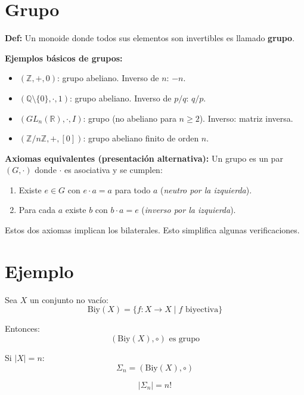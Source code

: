 \documentclass[12pt]{article}
\begin{document}
\section*{Grupo}

\textbf{Def:} Un monoide donde todos sus elementos son invertibles es llamado \textbf{grupo}.

\begin{tcolorbox}[iabox]
\textbf{Ejemplos básicos de grupos:}
\begin{itemize}
  \item $(\mathbb{Z},+,0)$: grupo abeliano. Inverso de $n$: $-n$.
  \item $(\mathbb{Q}\setminus\{0\},\cdot,1)$: grupo abeliano. Inverso de $p/q$: $q/p$.
  \item $(GL_n(\mathbb{R}),\cdot,I)$: grupo (no abeliano para $n\geq 2$). Inverso: matriz inversa.
  \item $(\mathbb{Z}/n\mathbb{Z},+,[0])$: grupo abeliano finito de orden $n$.
\end{itemize}

\textbf{Axiomas equivalentes (presentación alternativa):} Un grupo es un par $(G,\cdot)$ donde $\cdot$ es asociativa y se cumplen:
\begin{enumerate}
  \item Existe $e\in G$ con $e\cdot a=a$ para todo $a$ (\emph{neutro por la izquierda}).
  \item Para cada $a$ existe $b$ con $b\cdot a=e$ (\emph{inverso por la izquierda}).
\end{enumerate}
Estos dos axiomas implican los bilaterales. Esto simplifica algunas verificaciones.
\end{tcolorbox}

\section*{Ejemplo}

Sea $X$ un conjunto no vacío:
\[
\text{Biy}(X)=\{f:X\to X \mid f \text{ biyectiva}\}
\]

Entonces:
\[
(\text{Biy}(X),\circ) \text{ es grupo}
\]

Si $|X|=n$:
\[
\Sigma_n=(\text{Biy}(X),\circ)
\]

\[
|\Sigma_n|=n!
\]
\end{document}
